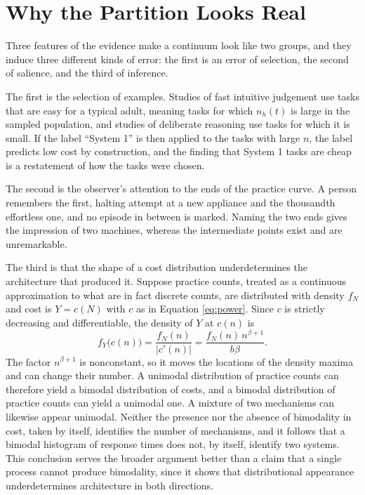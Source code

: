 \documentclass[11pt]{article}
\theoremstyle{definition}
\begin{document}
\section{Why the Partition Looks Real}

Three features of the evidence make a continuum look like two groups, and they induce three different kinds of error: the first is an error of selection, the second of salience, and the third of inference.

The first is the selection of examples. Studies of fast intuitive judgement use tasks that are easy for a typical adult, meaning tasks for which $n_h(t)$ is large in the sampled population, and studies of deliberate reasoning use tasks for which it is small. If the label ``System 1'' is then applied to the tasks with large $n$, the label predicts low cost by construction, and the finding that System 1 tasks are cheap is a restatement of how the tasks were chosen.

The second is the observer's attention to the ends of the practice curve. A person remembers the first, halting attempt at a new appliance and the thousandth effortless one, and no episode in between is marked. Naming the two ends gives the impression of two machines, whereas the intermediate points exist and are unremarkable.

The third is that the shape of a cost distribution underdetermines the architecture that produced it. Suppose practice counts, treated as a continuous approximation to what are in fact discrete counts, are distributed with density $f_N$ and cost is $Y=c(N)$ with $c$ as in Equation \eqref{eq:power}. Since $c$ is strictly decreasing and differentiable, the density of $Y$ at $c(n)$ is
\begin{equation}
f_Y\bigl(c(n)\bigr)=\frac{f_N(n)}{|c'(n)|}=\frac{f_N(n)\,n^{\beta+1}}{b\beta}.
\end{equation}
The factor $n^{\beta+1}$ is nonconstant, so it moves the locations of the density maxima and can change their number. A unimodal distribution of practice counts can therefore yield a bimodal distribution of costs, and a bimodal distribution of practice counts can yield a unimodal one. A mixture of two mechanisms can likewise appear unimodal. Neither the presence nor the absence of bimodality in cost, taken by itself, identifies the number of mechanisms, and it follows that a bimodal histogram of response times does not, by itself, identify two systems. This conclusion serves the broader argument better than a claim that a single process cannot produce bimodality, since it shows that distributional appearance underdetermines architecture in both directions.
\end{document}
